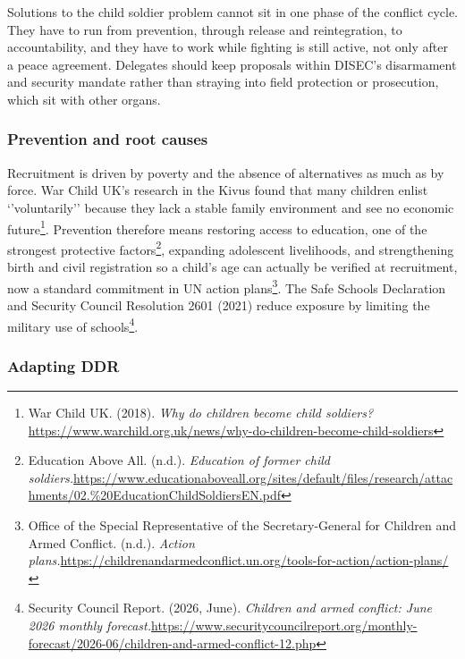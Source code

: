 Solutions to the child soldier problem cannot sit in one phase of the conflict cycle. They have to run from prevention, through release and reintegration, to accountability, and they have to work while fighting is still active, not only after a peace agreement. Delegates should keep proposals within DISEC’s disarmament and security mandate rather than straying into field protection or prosecution, which sit with other organs.

\subsubsection{Prevention and root causes}

Recruitment is driven by poverty and the absence of alternatives as much as by force. War Child UK’s research in the Kivus found that many children enlist ‘’voluntarily’’ because they lack a stable family environment and see no economic future\footnote{War Child UK. (2018). \emph{Why do children become child soldiers?}\url{https://www.warchild.org.uk/news/why-do-children-become-child-soldiers}}. Prevention therefore means restoring access to education, one of the strongest protective factors\footnote{Education Above All. (n.d.). \emph{Education of former child soldiers.}\url{https://www.educationaboveall.org/sites/default/files/research/attachments/02.\%20EducationChildSoldiersEN.pdf}}, expanding adolescent livelihoods, and strengthening birth and civil registration so a child's age can actually be verified at recruitment, now a standard commitment in UN action plans\footnote{Office of the Special Representative of the Secretary-General for Children and Armed Conflict. (n.d.). \emph{Action plans.}\url{https://childrenandarmedconflict.un.org/tools-for-action/action-plans/}}. The Safe Schools Declaration and Security Council Resolution 2601 (2021) reduce exposure by limiting the military use of schools\footnote{Security Council Report. (2026, June). \emph{Children and armed conflict: June 2026 monthly forecast.}\url{https://www.securitycouncilreport.org/monthly-forecast/2026-06/children-and-armed-conflict-12.php}}.

\subsubsection{Adapting DDR}

